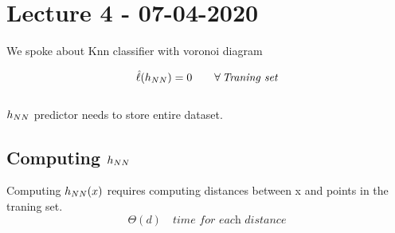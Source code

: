 \documentclass[../main.tex]{subfiles}
\begin{document}
\section{Lecture 4 - 07-04-2020}

We spoke about Knn classifier with voronoi diagram

$$
\hat{\ell}(h_{NN}) = 0 \qquad \forall \, \textit{Traning set}
$$
\\
$h_{NN}$ predictor needs to store entire dataset.
\\
\subsection{Computing $h_{NN}$}
Computing $h_{NN}(x)$ requires computing distances between x and points in the traning set.
\\
$$
\Theta(d) \quad \textit{time for each distance}
$$
\end{document}

